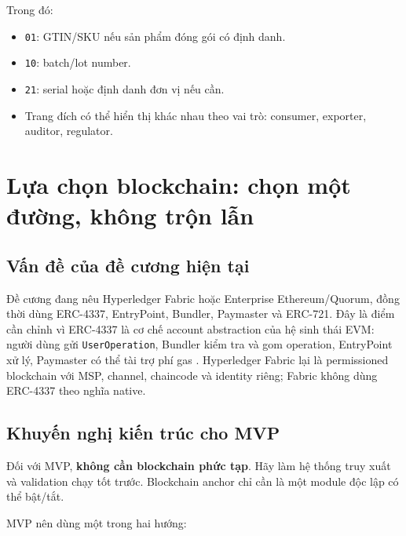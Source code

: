 \documentclass[12pt,a4paper]{article}
\begin{document}
Trong đó:
\begin{itemize}[leftmargin=2em]
    \item \texttt{01}: GTIN/SKU nếu sản phẩm đóng gói có định danh.
    \item \texttt{10}: batch/lot number.
    \item \texttt{21}: serial hoặc định danh đơn vị nếu cần.
    \item Trang đích có thể hiển thị khác nhau theo vai trò: consumer, exporter, auditor, regulator.
\end{itemize}

\section{Lựa chọn blockchain: chọn một đường, không trộn lẫn}

\subsection{Vấn đề của đề cương hiện tại}

Đề cương đang nêu Hyperledger Fabric hoặc Enterprise Ethereum/Quorum, đồng thời dùng ERC-4337, EntryPoint, Bundler, Paymaster và ERC-721. Đây là điểm cần chỉnh vì ERC-4337 là cơ chế account abstraction của hệ sinh thái EVM: người dùng gửi \texttt{UserOperation}, Bundler kiểm tra và gom operation, EntryPoint xử lý, Paymaster có thể tài trợ phí gas \cite{eip4337}. Hyperledger Fabric lại là permissioned blockchain với MSP, channel, chaincode và identity riêng; Fabric không dùng ERC-4337 theo nghĩa native.

\subsection{Khuyến nghị kiến trúc cho MVP}

\begin{tcolorbox}[colback=green!3!white,colframe=green!35!black,title=Khuyến nghị cho sinh viên]
Đối với MVP, \textbf{không cần blockchain phức tạp}. Hãy làm hệ thống truy xuất và validation chạy tốt trước. Blockchain anchor chỉ cần là một module độc lập có thể bật/tắt.
\end{tcolorbox}

MVP nên dùng một trong hai hướng:
\end{document}
